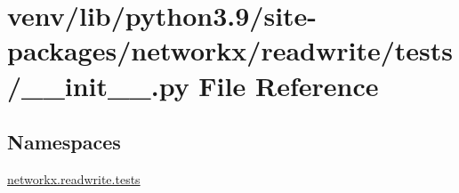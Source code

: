 \hypertarget{venv_2lib_2python3_89_2site-packages_2networkx_2readwrite_2tests_2____init_____8py}{}\section{venv/lib/python3.9/site-\/packages/networkx/readwrite/tests/\+\_\+\+\_\+init\+\_\+\+\_\+.py File Reference}
\label{venv_2lib_2python3_89_2site-packages_2networkx_2readwrite_2tests_2____init_____8py}
\subsection*{Namespaces}
\begin{DoxyCompactItemize}
\item 
 \hyperlink{namespacenetworkx_1_1readwrite_1_1tests}{networkx.\+readwrite.\+tests}
\end{DoxyCompactItemize}
